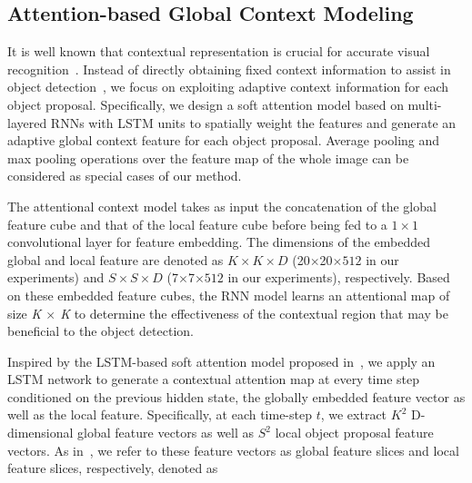 \documentclass[journal]{IEEEtran}
\begin{document}
\subsection{Attention-based Global Context Modeling}\label{sssec:global}
It is well known that contextual representation is crucial for accurate visual recognition~\cite{bell2016inside, li2015visual, li2016attentive, mottaghi2014role,li2017context,li2017instance}. Instead of directly obtaining fixed context information to assist in object detection~\cite{li2016attentive,mottaghi2014role}, we focus on exploiting adaptive context information for each object proposal. Specifically, we design a soft attention model  based on multi-layered RNNs with  LSTM units to spatially weight the features and generate an adaptive global context feature for each object proposal. Average pooling and max pooling operations over the feature map of the whole image can be considered as special cases of our method.

The attentional context model takes as input the concatenation of the global feature cube and that of the local feature cube before being fed to a $1 \times 1$ convolutional layer for feature embedding. The dimensions of the embedded global and local feature are denoted as $K\times K\times D$ (20$\times$20$\times 512$ in our experiments) and $S\times S\times D$ (7$\times$7$\times 512$ in our experiments), respectively. Based on these embedded feature cubes, the RNN model learns an attentional map of size \textit{K $\times$ K} to determine the effectiveness of the contextual region that may be beneficial to the object detection. 

Inspired by the LSTM-based soft attention model proposed in~\cite{sharma2015action}, we apply an LSTM network to generate a contextual attention map at every time step conditioned on the previous hidden state, the globally embedded feature vector as well as the local feature. Specifically, at each time-step $t$, we extract $K^2$ D-dimensional global feature vectors as well as $S^2$ local object proposal feature vectors. As in~\cite{sharma2015action}, we refer to these feature vectors as global feature slices and local feature slices, respectively, denoted as
\end{document}
